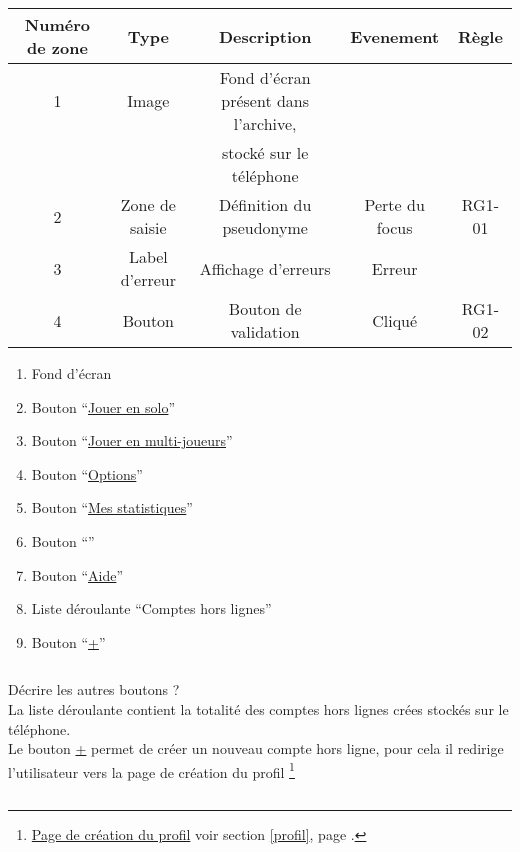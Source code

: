 \documentclass{report}
\begin{document}
		
		
		\begin{tabular}{|c|c|c|c|c|} \hline
			Numéro de zone & Type  & Description & Evenement &	Règle \\\hline 
			1 & Image & Fond d'écran présent dans l'archive, &  &\\\ 
			  &       & stocké sur le téléphone              &	&\\\hline
			2 & Zone de saisie & Définition du pseudonyme & Perte du focus & RG1-01 \\\hline
			3 & Label d'erreur & Affichage d'erreurs      & Erreur         &  \\\hline
			4 & Bouton         & Bouton de validation     & Cliqué & RG1-02 \\\hline
		\end{tabular}
		
		\begin{enumerate}
		  \item Fond d'écran
		  \item Bouton ``\hyperlink{Creer partie solo}{Jouer en solo}''
		  \item Bouton ``\hyperlink{Connexion multi-joueurs}{Jouer en multi-joueurs}''
		  \item Bouton ``\hyperlink{Options}{Options}''
		  \item Bouton ``\hyperlink{Statistiques}{Mes statistiques}''
		  \item Bouton ``''
		  \item Bouton ``\hyperlink{Aide}{Aide}''
		  \item Liste déroulante ``Comptes hors lignes''
		  \item Bouton ``\hyperlink{Création du profil}{+}'' 
		\end{enumerate}
		
		$\,$
		
		Décrire les autres boutons ? \\		
		La liste déroulante contient la totalité des comptes hors lignes crées stockés
		sur le téléphone. \\
		Le bouton \hyperlink{Création du profil}{+} permet de créer un nouveau compte
		hors ligne, pour cela il redirige l'utilisateur vers la page de création du profil%
		\footnote[1]{
			\hyperlink{Création du profil}{Page de création du profil}
			\og voir section \ref{profil}, page \pageref{profil}.\fg
		}
		
		$\,$
	
\newpage
\end{document}
